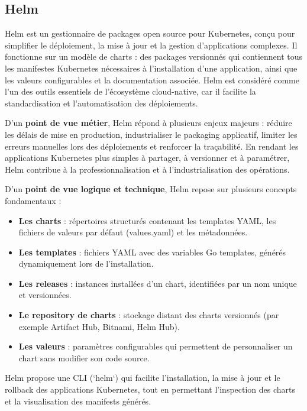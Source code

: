 \subsection{Helm}

Helm est un gestionnaire de packages open source pour Kubernetes, conçu pour simplifier le déploiement, la mise à jour et la gestion d’applications complexes. Il fonctionne sur un modèle de charts  : des packages versionnés qui contiennent tous les manifestes Kubernetes nécessaires à l’installation d’une application, ainsi que les valeurs configurables et la documentation associée. Helm est considéré comme l’un des outils essentiels de l’écosystème cloud-native, car il facilite la standardisation et l’automatisation des déploiements.

D’un \textbf{point de vue métier}, Helm répond à plusieurs enjeux majeurs  : réduire les délais de mise en production, industrialiser le packaging applicatif, limiter les erreurs manuelles lors des déploiements et renforcer la traçabilité. En rendant les applications Kubernetes plus simples à partager, à versionner et à paramétrer, Helm contribue à la professionnalisation et à l’industrialisation des opérations.

D’un \textbf{point de vue logique et technique}, Helm repose sur plusieurs concepts fondamentaux  :
\begin{itemize}
	\item \textbf{Les charts}  : répertoires structurés contenant les templates YAML, les fichiers de valeurs par défaut (values.yaml) et les métadonnées.
	\item \textbf{Les templates}  : fichiers YAML avec des variables Go templates, générés dynamiquement lors de l’installation.
	\item \textbf{Les releases}  : instances installées d’un chart, identifiées par un nom unique et versionnées.
	\item \textbf{Le repository de charts}  : stockage distant des charts versionnés (par exemple Artifact Hub, Bitnami, Helm Hub).
	\item \textbf{Les valeurs}  : paramètres configurables qui permettent de personnaliser un chart sans modifier son code source.
\end{itemize}

Helm propose une CLI (`helm`) qui facilite l’installation, la mise à jour et le rollback des applications Kubernetes, tout en permettant l’inspection des charts et la visualisation des manifests générés.

